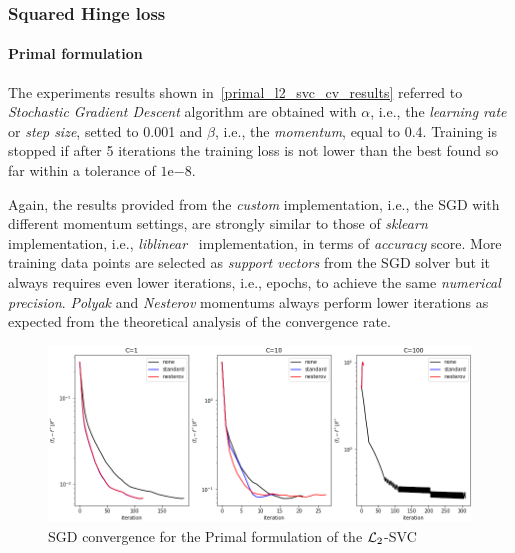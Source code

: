 \pagebreak

\subsubsection{Squared Hinge loss}

\paragraph{Primal formulation}

The experiments results shown in~\ref{primal_l2_svc_cv_results} referred to \emph{Stochastic Gradient Descent} algorithm are obtained with $\alpha$, i.e., the \emph{learning rate} or \emph{step size}, setted to 0.001 and $\beta$, i.e., the \emph{momentum}, equal to 0.4. Training is stopped if after 5 iterations the training loss is not lower than the best found so far within a tolerance of $1\mathrm{e}{-8}$.



Again, the results provided from the \emph{custom} implementation, i.e., the SGD with different momentum settings, are strongly similar to those of \emph{sklearn} implementation, i.e., \emph{liblinear}~\cite{fan2008liblinear} implementation, in terms of \emph{accuracy} score. More training data points are selected as \emph{support vectors} from the SGD solver but it always requires even lower iterations, i.e., epochs, to achieve the same \emph{numerical precision}. \emph{Polyak} and \emph{Nesterov} momentums always perform lower iterations as expected from the theoretical analysis of the convergence rate.

\begin{figure}[H]
	\centering
	\includegraphics[scale=0.55]{img/l2_svc_loss_history}
	\caption{SGD convergence for the Primal formulation of the $\protect \mathcal{L}_2$-SVC}
	\label{fig:l2_svc_loss_history}
\end{figure}

\pagebreak

